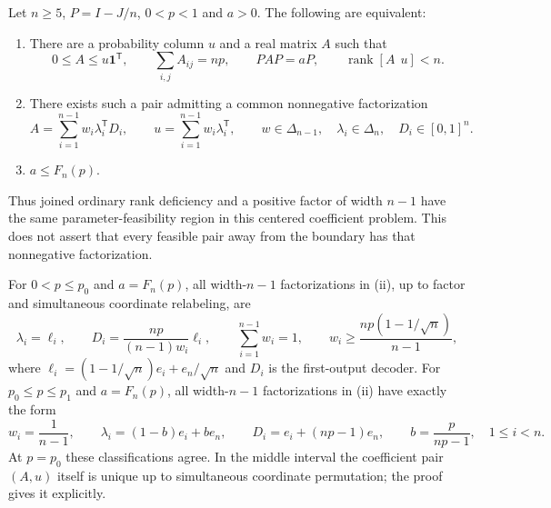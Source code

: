\begin{theorem}
\label{thm:r76-bounded-coefficients}
Let $n\ge5$, $P=I-J/n$, $0<p<1$ and $a>0$. The following are equivalent:
\begin{enumerate}
\item There are a probability column $u$ and a real matrix $A$ such that
\[
 0\le A\le u\mathbf1^{\mathsf T},\qquad
 \sum_{i,j}A_{ij}=np,\qquad PAP=aP,\qquad
 \operatorname{rank}[A\ \ u]<n.
\]
\item There exists such a pair admitting a common nonnegative factorization
\[
 A=\sum_{i=1}^{n-1}w_i\lambda_i^{\mathsf T}D_i,
 \qquad u=\sum_{i=1}^{n-1}w_i\lambda_i^{\mathsf T},
 \qquad w\in\Delta_{n-1},\quad
 \lambda_i\in\Delta_n,\quad D_i\in[0,1]^n.
\]
\item $a\le F_n(p)$.
\end{enumerate}
Thus joined ordinary rank deficiency and a positive factor of width
$n-1$ have the same parameter-feasibility region in this centered
coefficient problem. This does not assert that every feasible pair
away from the boundary has that nonnegative factorization.

For $0<p\le p_0$ and $a=F_n(p)$, all width-$n-1$ factorizations in (ii), up to factor and simultaneous
coordinate relabeling, are
\begin{equation}\label{eq:r76-low-mean-rigidity}
 \lambda_i=\ell_i,\qquad
 D_i=\frac{np}{(n-1)w_i}\ell_i,\qquad
 \sum_{i=1}^{n-1}w_i=1,\qquad
 w_i\ge\frac{np(1-1/\sqrt n)}{n-1},
\end{equation}
where $\ell_i=(1-1/\sqrt n)e_i+e_n/\sqrt n$ and $D_i$ is the
first-output decoder. For $p_0\le p\le p_1$ and $a=F_n(p)$,
all width-$n-1$ factorizations in (ii) have exactly the form
\begin{equation}\label{eq:r76-middle-rigidity}
 w_i=\frac1{n-1},\qquad
 \lambda_i=(1-b)e_i+b e_n,\qquad
 D_i=e_i+(np-1)e_n,\qquad b=\frac p{np-1},
 \quad 1\le i<n.
\end{equation}
At $p=p_0$ these classifications agree. In the middle interval the
coefficient pair $(A,u)$ itself is unique up to simultaneous coordinate
permutation; the proof gives it explicitly.
\end{theorem}
